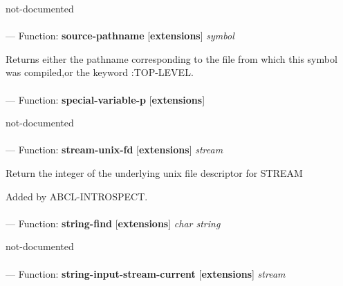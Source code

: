 \begin{adjustwidth}{5em}{5em}
not-documented
\end{adjustwidth}

\paragraph{}
\label{EXTENSIONS:SOURCE-PATHNAME}
--- Function: \textbf{source-pathname} [\textbf{extensions}] \textit{symbol}

\begin{adjustwidth}{5em}{5em}
Returns either the pathname corresponding to the file from which this symbol was compiled,or the keyword :TOP-LEVEL.
\end{adjustwidth}

\paragraph{}
\label{EXTENSIONS:SPECIAL-VARIABLE-P}
--- Function: \textbf{special-variable-p} [\textbf{extensions}] \textit{}

\begin{adjustwidth}{5em}{5em}
not-documented
\end{adjustwidth}

\paragraph{}
\label{EXTENSIONS:STREAM-UNIX-FD}
--- Function: \textbf{stream-unix-fd} [\textbf{extensions}] \textit{stream}

\begin{adjustwidth}{5em}{5em}
Return the integer of the underlying unix file descriptor for STREAM

Added by ABCL-INTROSPECT.
\end{adjustwidth}

\paragraph{}
\label{EXTENSIONS:STRING-FIND}
--- Function: \textbf{string-find} [\textbf{extensions}] \textit{char string}

\begin{adjustwidth}{5em}{5em}
not-documented
\end{adjustwidth}

\paragraph{}
\label{EXTENSIONS:STRING-INPUT-STREAM-CURRENT}
--- Function: \textbf{string-input-stream-current} [\textbf{extensions}] \textit{stream}

